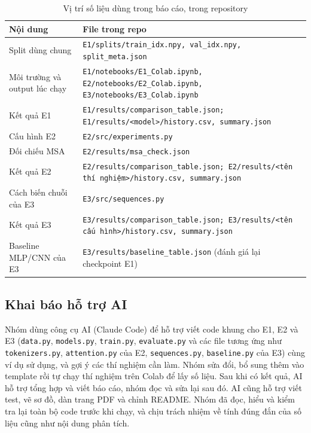 \documentclass[12pt,a4paper]{article}
\begin{document}
\begin{table}[H]
\centering
\caption{Vị trí số liệu dùng trong báo cáo, trong repository}
\begin{tabular}{lp{8.5cm}}
\toprule
Nội dung & File trong repo \\
\midrule
Split dùng chung & \texttt{E1/splits/train\_idx.npy, val\_idx.npy, split\_meta.json} \\
Môi trường và output lúc chạy & \texttt{E1/notebooks/E1\_Colab.ipynb, E2/notebooks/E2\_Colab.ipynb, E3/notebooks/E3\_Colab.ipynb} \\
Kết quả E1 & \texttt{E1/results/comparison\_table.json; E1/results/<model>/history.csv, summary.json} \\
Cấu hình E2 & \texttt{E2/src/experiments.py} \\
Đối chiếu MSA & \texttt{E2/results/msa\_check.json} \\
Kết quả E2 & \texttt{E2/results/comparison\_table.json; E2/results/<tên thí nghiệm>/history.csv, summary.json} \\
Cách biến chuỗi của E3 & \texttt{E3/src/sequences.py} \\
Kết quả E3 & \texttt{E3/results/comparison\_table.json; E3/results/<tên cấu hình>/history.csv, summary.json} \\
Baseline MLP/CNN của E3 & \texttt{E3/results/baseline\_table.json} (đánh giá lại checkpoint E1) \\
\bottomrule
\end{tabular}
\end{table}

\subsection*{Khai báo hỗ trợ AI}

Nhóm dùng công cụ AI (Claude Code) để hỗ trợ viết code khung cho E1, E2 và E3
(\texttt{data.py}, \texttt{models.py}, \texttt{train.py}, \texttt{evaluate.py}
và các file tương ứng như \texttt{tokenizers.py}, \texttt{attention.py} của E2,
\texttt{sequences.py}, \texttt{baseline.py} của E3) cùng ví dụ sử dụng, và gợi
ý các thí nghiệm cần làm. Nhóm sửa đổi, bổ sung
thêm vào template rồi tự chạy thí nghiệm trên Colab để lấy số liệu. Sau khi
có kết quả, AI hỗ trợ tổng hợp và viết báo cáo, nhóm đọc và sửa lại sau đó. AI
cũng hỗ trợ viết test, vẽ sơ đồ, dàn trang PDF và chỉnh README. Nhóm đã đọc,
hiểu và kiểm tra lại toàn bộ code trước khi chạy, và chịu trách nhiệm về tính
đúng đắn của số liệu cũng như nội dung phân tích.
\end{document}
